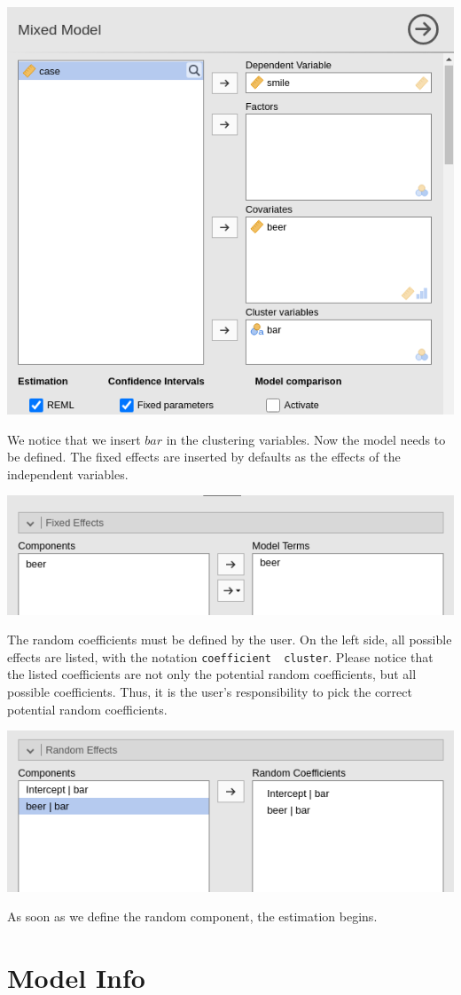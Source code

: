 \documentclass[
]{book}
\begin{document}
\includegraphics[width=0.7\linewidth]{bookletpics/4_simple_input1}

We notice that we insert \(bar\) in the clustering variables. Now the model needs to be defined. The fixed effects are inserted by defaults as the effects of the independent variables.

\includegraphics[width=0.7\linewidth]{bookletpics/4_simple_input2}

The random coefficients must be defined by the user. On the left side, all possible effects are listed, with the notation \texttt{coefficient\ \textbar{}\ cluster}. Please notice that the listed coefficients are not only the potential random coefficients, but all possible coefficients. Thus, it is the user's responsibility to pick the correct potential random coefficients.

\includegraphics[width=0.7\linewidth]{bookletpics/4_simple_input3}

As soon as we define the random component, the estimation begins.

\hypertarget{model-info}{%
\section{Model Info}\label{model-info}}
\end{document}

